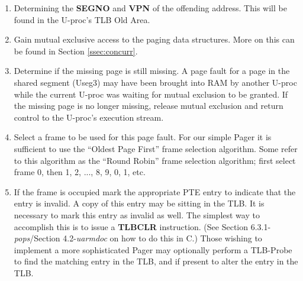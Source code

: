 \begin{enumerate}
\item Determining the \textbf{SEGNO} and \textbf{VPN} of the offending address. 
This will be found in the U-proc's TLB Old Area.
\item Gain mutual exclusive access to the paging data structures. More on this can be found in Section \ref{ssec:concurr}.
\item Determine if the missing page is still missing. 
A page fault for a page in the shared segment (Useg3) may have been brought into RAM by another U-proc while the current U-proc was waiting for mutual exclusion to be granted. 
If the missing page is no longer missing, release mutual exclusion and return control to the U-proc's execution stream.
\item Select a frame to be used for this page fault. 
For our simple Pager it is sufficient to use the ``Oldest Page First'' frame selection algorithm. 
Some refer to this algorithm as the ``Round Robin'' frame selection algorithm; first select frame 0, then 1, 2, ..., 8, 9, 0, 1, etc.
\item If the frame is occupied mark the appropriate PTE entry to indicate that the entry is invalid. 
A copy of this entry may be sitting in the TLB. 
It is necessary to mark this entry as invalid as well. 
The simplest way to accomplish this is to issue a \textbf{TLBCLR} instruction. 
(See Section 6.3.1-\emph{pops}/Section 4.2-\emph{uarmdoc} on how to do this in C.) 
Those wishing to implement a more sophisticated Pager may optionally perform a TLB-Probe to find the matching entry in the TLB, and if present to alter the entry in the TLB.


\end{enumerate}
